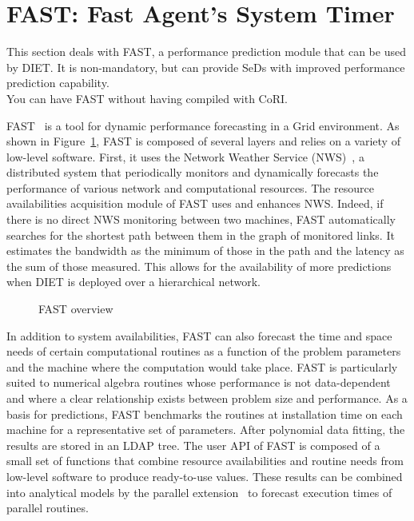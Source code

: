\section{FAST: Fast Agent's System Timer}
\label{sec:FAST}

This section deals with FAST, a performance prediction module that
can be used by DIET. It is non-mandatory, but can provide SeDs with
improved performance prediction capability.\\
You can have FAST without having compiled with CoRI.

FAST~\cite{Qui02} is a tool for dynamic performance forecasting in a
Grid environment. As shown in Figure~\ref{fig:fast-overview}, FAST
is composed of several layers and relies on a variety of low-level
software. First, it uses the Network Weather Service
(NWS)~\cite{WSH99}, a distributed system that periodically monitors
and dynamically forecasts the performance of various network and
computational resources. The resource availabilities acquisition
module of FAST uses and enhances NWS. Indeed, if there is no direct
NWS monitoring between two machines, FAST automatically searches for
the shortest path between them in the graph of monitored links. It
estimates the bandwidth as the minimum of those in the path and the
latency as the sum of those measured. This allows for the
availability of more predictions when DIET is deployed over a
hierarchical network.

\begin{figure}[htb]
  \begin{center}
    \caption{FAST overview}
    \label{fig:fast-overview}
  \end{center}
\end{figure}

In addition to system availabilities, FAST can also forecast the
time and space needs of certain computational routines as a function
of the problem parameters and the machine where the computation
would take place.  FAST is particularly suited to numerical algebra
routines whose performance is not data-dependent and where a clear
relationship exists between problem size and performance. As a basis
for predictions, FAST benchmarks the routines at installation time
on each machine for a representative set of parameters. After
polynomial data fitting, the results are stored in an LDAP tree. The
user API of FAST is composed of a small set of functions that
combine resource availabilities and routine needs from low-level
software to produce ready-to-use values.  These results can be
combined into analytical models by the parallel
extension~\cite{CS02} to forecast execution times of parallel
routines.

